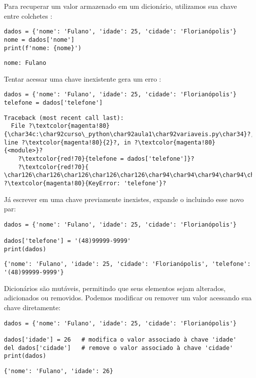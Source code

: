 Para recuperar um valor armazenado em um dicionário, utilizamos sua chave entre colchetes \inlcode{[]}:
\begin{verbatim}
dados = {'nome': 'Fulano', 'idade': 25, 'cidade': 'Florianópolis'}
nome = dados['nome']
print(f'nome: {nome}')
\end{verbatim}
\begin{verbatim}
nome: Fulano
\end{verbatim}

Tentar acessar uma chave inexistente gera um erro :
\begin{verbatim}
dados = {'nome': 'Fulano', 'idade': 25, 'cidade': 'Florianópolis'}
telefone = dados['telefone']
\end{verbatim}
\begin{verbatim}
Traceback (most recent call last):
  File ?\textcolor{magenta!80}{\char34c:\char92curso\_python\char92aula1\char92variaveis.py\char34}?, line ?\textcolor{magenta!80}{2}?, in ?\textcolor{magenta!80}{<module>}?
    ?\textcolor{red!70}{telefone = dados['telefone']}?
    ?\textcolor{red!70}{           \char126\char126\char126\char126\char126\char94\char94\char94\char94\char94\char94\char94\char94\char94\char94\char94\char94}?
?\textcolor{magenta!80}{KeyError: 'telefone'}?
\end{verbatim}

Já escrever em uma chave previamente inexistes, expande o  incluindo esse novo par:
\begin{verbatim}
dados = {'nome': 'Fulano', 'idade': 25, 'cidade': 'Florianópolis'}

dados['telefone'] = '(48)99999-9999'
print(dados)
\end{verbatim}
\begin{verbatim}
{'nome': 'Fulano', 'idade': 25, 'cidade': 'Florianópolis', 'telefone': '(48)99999-9999'}
\end{verbatim}

Dicionários são mutáveis, permitindo que seus elementos sejam alterados, adicionados ou removidos.
Podemos modificar ou remover um valor acessando sua chave diretamente:
\begin{verbatim}
dados = {'nome': 'Fulano', 'idade': 25, 'cidade': 'Florianópolis'}

dados['idade'] = 26   # modifica o valor associado à chave 'idade'
del dados['cidade']   # remove o valor associado à chave 'cidade'
print(dados)
\end{verbatim}
\begin{verbatim}
{'nome': 'Fulano', 'idade': 26}
\end{verbatim}


